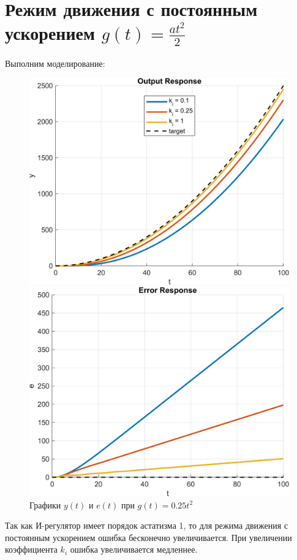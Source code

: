 \section{Режим движения с постоянным ускорением $g(t) = \frac{at^2}{2}$}
Выполним моделирование:
\begin{figure}[H]
    \centering
    \begin{minipage}{0.45\textwidth}
        \centering
        \includegraphics[width=1\textwidth, trim={1cm 0cm 1cm 0cm}]{../images/4_5.png}
    \end{minipage}
    \hfill
    \begin{minipage}{0.45\textwidth}
        \centering
        \includegraphics[width=1\textwidth, trim={1cm 0cm 1cm 0cm}]{../images/4_6.png}
    \end{minipage}
    \caption{Графики $y(t)$ и $e(t)$ при $g(t) = 0.25t^2$}
\end{figure}

Так как И-регулятор имеет порядок астатизма 1, то для режима движения с
 постоянным ускорением ошибка бесконечно увеличивается.
 При увеличении коэффициента $k_i$ ошибка увеличивается медленнее.
\endinput